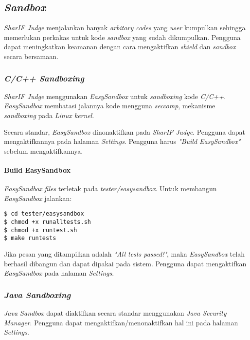 \subsection{\textit{Sandbox}}
\label{subsec:sandbox}
\textit{SharIF Judge} menjalankan banyak \textit{arbitary codes} yang \textit{user} kumpulkan sehingga memerlukan perkakas untuk kode \textit{sandbox} yang sudah dikumpulkan. Pengguna dapat meningkatkan keamanan dengan cara mengaktifkan \textit{shield} dan \textit{sandbox} secara bersamaan.

\subsubsection{\textit{C/C++ Sandboxing}}
\label{subsubsec:sandbox_c/c++}
\textit{SharIF Judge} menggunakan \textit{EasySandbox} untuk \textit{sandboxing} kode \textit{C/C++}. \textit{EasySandbox} membatasi jalannya kode mengguna \textit{seccomp}, mekanisme \textit{sandboxing} pada \textit{Linux kernel}.

Secara standar, \textit{EasySandbox} dinonaktifkan pada \textit{SharIF Judge}. Pengguna dapat mengaktifkannya pada halaman \textit{Settings}. Pengguna harus \textit{"Build EasySandbox"} sebelum mengaktifkannya.

\paragraph{Build EasySandbox}
\textit{EasySandbox files} terletak pada \textit{tester/easysandbox}. Untuk membangun \textit{EasySandbox} jalankan:

\begin{lstlisting}[basicstyle=\ttfamily, frame=single,
columns=fullflexible, keepspaces=true, breaklines=true, label=ls:18]
$ cd tester/easysandbox
$ chmod +x runalltests.sh
$ chmod +x runtest.sh
$ make runtests
\end{lstlisting}

Jika pesan yang ditampilkan adalah \textit{"All tests passed!"}, maka \textit{EasySandbox} telah berhasil dibangun dan dapat dipakai pada sistem. Pengguna dapat mengaktifkan \textit{EasySandbox} pada halaman \textit{Settings}.

\subsubsection{\textit{Java Sandboxing}}
\label{subsubsec:java_sandbox}
\textit{Java Sandbox} dapat diaktifkan secara standar menggunakan \textit{Java Security Manager}. Pengguna dapat mengaktifkan/menonaktifkan hal ini pada halaman \textit{Settings}.

